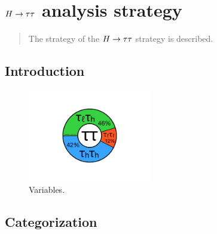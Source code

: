 \chapter[$\Htautau$ analysis strategy][$\Htautau$ analysis strategy]{$\Htautau$ analysis strategy}
\label{chap:strategy}

\begin{quote}
The strategy of the $\Htautau$ strategy is described.
\end{quote}

\section{Introduction}
\label{sec:strategy-introduction}

\begin{figure}[tp]
  \centering
  \includegraphics[width=0.48\textwidth]{figures/piecharts/tautaudecay}
  \caption{Variables.}
  \label{fig:strategy-decaypie}
\end{figure}

\section{Categorization}
\label{sec:strategy-categorization}


